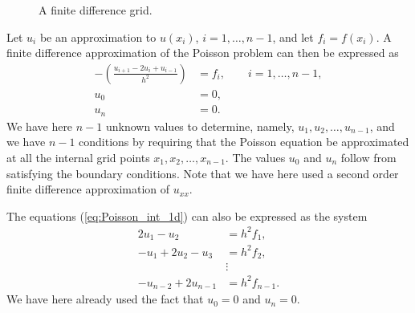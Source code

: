\begin{figure}
  \centering
  \caption{A finite difference grid.}
  \label{fig:Poisson1D_Grid}
\end{figure}

Let $u_i$ be an approximation to $u(x_i)$, $i=1,\ldots,n-1$, and let $f_i =
f(x_i)$. A finite difference approximation of the Poisson problem can then be
expressed as
\begin{align}
  -\left( \frac{u_{i+1} - 2u_i + u_{i-1}}{h^2} \right) &= f_i, \qquad i=1,\ldots,n-1,
  \label{eq:Poisson_int_1d}\\
  u_0 &= 0, \\
  u_{n} &= 0.
\end{align}
We have here $n-1$ unknown values to determine, namely, $u_1, u_2, \ldots,
u_{n-1}$, and we have $n-1$ conditions by requiring that the Poisson equation be
approximated at all the internal grid points $x_1, x_2, \ldots,x_{n-1}$. The
values $u_0$ and $u_{n}$ follow from satisfying the boundary conditions. Note
that we have here used a second order finite difference approximation of
$u_{xx}$.

The equations (\ref{eq:Poisson_int_1d}) can also be expressed as the system
\begin{align*}
  2 u_1 - u_2 &= h^2 f_1, \\
  -u_1 + 2 u_2 - u_3 &= h^2 f_2, \\
  &\vdots \\
  -u_{n-2} + 2 u_{n-1} &= h^2 f_{n-1}.
\end{align*}
We have here already used the fact that $u_0=0$ and $u_{n}=0$.

